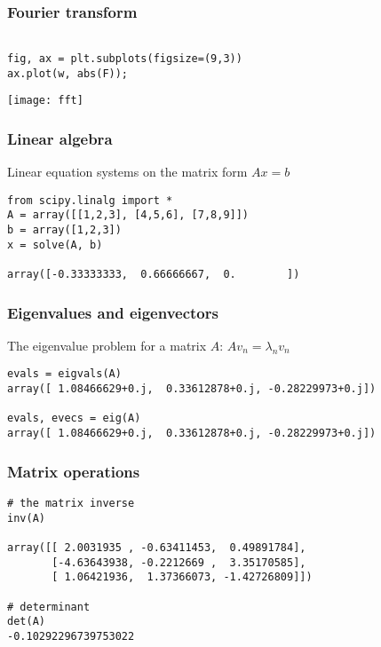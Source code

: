 \begin{frame}[fragile]\frametitle{Fourier transform}
\begin{lstlisting}

fig, ax = plt.subplots(figsize=(9,3))
ax.plot(w, abs(F));
\end{lstlisting}
\begin{center}
\texttt{[image: fft]}
\end{center}
\end{frame}

\begin{frame}[fragile]\frametitle{Linear algebra}
Linear equation systems on the matrix form $A x = b$
\begin{lstlisting}
from scipy.linalg import *
A = array([[1,2,3], [4,5,6], [7,8,9]])
b = array([1,2,3])
x = solve(A, b)

array([-0.33333333,  0.66666667,  0.        ])
\end{lstlisting}
\end{frame}

\begin{frame}[fragile]\frametitle{Eigenvalues and eigenvectors}
The eigenvalue problem for a matrix $A$:
$A v_n = \lambda_n v_n$
\begin{lstlisting}
evals = eigvals(A)
array([ 1.08466629+0.j,  0.33612878+0.j, -0.28229973+0.j])

evals, evecs = eig(A)
array([ 1.08466629+0.j,  0.33612878+0.j, -0.28229973+0.j])
\end{lstlisting}
\end{frame}

\begin{frame}[fragile]\frametitle{Matrix operations}
\begin{lstlisting}
# the matrix inverse
inv(A)

array([[ 2.0031935 , -0.63411453,  0.49891784],
       [-4.63643938, -0.2212669 ,  3.35170585],
       [ 1.06421936,  1.37366073, -1.42726809]])

# determinant
det(A)
-0.10292296739753022
       
\end{lstlisting}
\end{frame}

